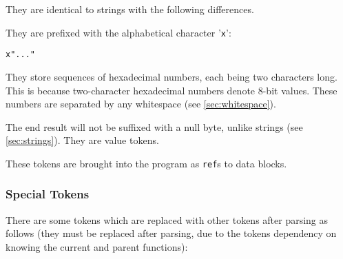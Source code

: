 \documentclass[10pt,a4paper]{article}
\begin{document}
They are identical to strings with the following differences.

They are prefixed with the alphabetical character '\verb|x|':
\begin{verbatim}
x"..."
\end{verbatim}

They store sequences of hexadecimal numbers, each being two characters long. This is because two-character hexadecimal numbers denote 8-bit values. These numbers are separated by any whitespace (see \ref{sec:whitespace}). 

The end result will not be suffixed with a null byte, unlike strings (see \ref{sec:strings}). They are value tokens.

These tokens are brought into the program as \verb|ref|s to data blocks.

\subsubsection{Special Tokens}
\label{sec:specialTokens}
There are some tokens which are replaced with other tokens after parsing as follows (they must be replaced after parsing, due to the tokens dependency on knowing the current and parent functions):
\end{document}
